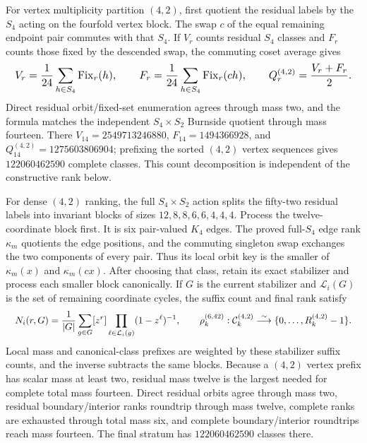 \documentclass{article}
\newcommand{\fitmath}[1]{\resizebox{0.99\linewidth}{!}{$\displaystyle #1$}}
\begin{document}
For vertex multiplicity partition $(4,2)$, first quotient the residual labels by
the $S_4$ acting on the fourfold vertex block. The swap $c$ of the equal
remaining endpoint pair commutes with that $S_4$. If $V_r$ counts residual
$S_4$ classes and $F_r$ counts those fixed by the descended swap, the commuting
coset average gives
\begin{equation}
  \fitmath{%
    V_r=\frac1{24}\sum_{h\in S_4}\operatorname{Fix}_r(h),\qquad
    F_r=\frac1{24}\sum_{h\in S_4}\operatorname{Fix}_r(ch),\qquad
    Q_r^{(4,2)}=\frac{V_r+F_r}{2}.
  }
  \label{eq:optimization-crazy-sextuple-s6-s4s2-decomposition}
\end{equation}
Direct residual orbit/fixed-set enumeration agrees through mass two, and the
formula matches the independent $S_4\times S_2$ Burnside quotient through mass
fourteen. There $V_{14}=2549713246880$, $F_{14}=1494366928$, and
$Q_{14}^{(4,2)}=1275603806904$; prefixing the sorted $(4,2)$ vertex sequences
gives $122060462590$ complete classes. This count decomposition is independent
of the constructive rank below.

For dense $(4,2)$ ranking, the full $S_4\times S_2$ action splits the fifty-two
residual labels into invariant blocks of sizes
$12,8,8,6,6,4,4,4$. Process the twelve-coordinate block first. It is six
pair-valued $K_4$ edges. The proved full-$S_4$ edge rank $\kappa_m$ quotients
the
edge positions, and the commuting singleton swap exchanges the two components
of every pair. Thus its local orbit key is the smaller of
$\kappa_m(x)$ and $\kappa_m(cx)$. After choosing that class, retain its exact
stabilizer and process each smaller block canonically. If $G$ is the current
stabilizer and $\mathcal L_i(G)$ is the set of remaining coordinate cycles, the
suffix count and final rank satisfy
\begin{equation}
  \fitmath{%
    N_i(r,G)=\frac1{|G|}\sum_{g\in G}[z^r]
      \prod_{\ell\in\mathcal L_i(g)}(1-z^\ell)^{-1},
    \qquad
    \rho_k^{(6,42)}:\mathcal C_k^{(4,2)}
      \overset{\sim}{\longrightarrow}\{0,\ldots,R_k^{(4,2)}-1\}.
  }
  \label{eq:optimization-crazy-sextuple-s6-s4s2-vertex-ranking}
\end{equation}
Local mass and canonical-class prefixes are weighted by these stabilizer suffix
counts, and the inverse subtracts the same blocks. Because a $(4,2)$ vertex
prefix has scalar mass at least two, residual mass twelve is the largest needed
for complete total mass fourteen. Direct residual orbits agree through mass two,
residual boundary/interior ranks roundtrip through mass twelve, complete ranks
are exhausted through total mass six, and complete boundary/interior roundtrips
reach mass fourteen. The final stratum has $122060462590$ classes there.
\end{document}
